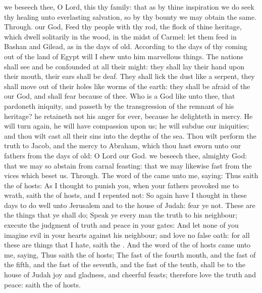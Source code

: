 \collect
{} we beseech thee, O Lord, this thy family: that as by thine inspiration we do seek thy healing unto everlasting salvation, so by thy bounty we may obtain the same. Through.
 our God, Feed thy people with thy rod, the flock of thine heritage, which dwell solitarily in the wood, in the midst of Carmel: let them feed in Bashan and Gilead, as in the days of old. According to the days of thy coming out of the land of Egypt will I shew unto him marvellous things. The nations shall see and be confounded at all their might: they shall lay their hand upon their mouth, their ears shall be deaf. They shall lick the dust like a serpent, they shall move out of their holes like worms of the earth: they shall be afraid of the  our God, and shall fear because of thee. Who is a God like unto thee, that pardoneth iniquity, and passeth by the transgression of the remnant of his heritage? he retaineth not his anger for ever, because he delighteth in mercy. He will turn again, he will have compassion upon us; he will subdue our iniquities; and thou wilt cast all their sins into the depths of the sea. Thou wilt perform the truth to Jacob, and the mercy to Abraham, which thou hast sworn unto our fathers from the days of old: O Lord our God.
\collect
{} we beseech thee, almighty God: that we may so abstain from carnal feasting: that we may likewise fast from the vices which beset us. Through.
 The word of the  came unto me, saying: Thus saith the  of hosts: As I thought to punish you, when your fathers provoked me to wrath, saith the  of hosts, and I repented not: So again have I thought in these days to do well unto Jerusalem and to the house of Judah: fear ye not. These are the things that ye shall do; Speak ye every man the truth to his neighbour; execute the judgment of truth and peace in your gates: And let none of you imagine evil in your hearts against his neighbour; and love no false oath: for all these are things that I hate, saith the . And the word of the  of hosts came unto me, saying, Thus saith the  of hosts; The fast of the fourth month, and the fast of the fifth, and the fast of the seventh, and the fast of the tenth, shall be to the house of Judah joy and gladness, and cheerful feasts; therefore love the truth and peace: saith the  of hosts.
